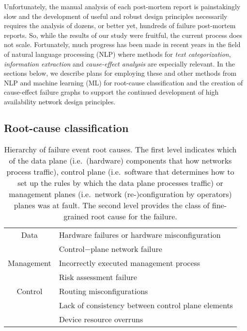 
Unfortunately, the manual analysis of each post-mortem report is
painstakingly slow and the development of useful and robust design
principles necessarily requires the analysis of dozens, or better yet,
hundreds of failure post-mortem reports.  So, while the results of our
study were fruitful, the current process does not scale.
%
Fortunately, much progress has been made in recent years in the field
of natural language processing (NLP) where methods for {\it text
  categorization}, {\it information extraction} and {\it cause-effect
  analysis} are especially relevant.  In the sections below, we
 describe plans for employing these and other methods from NLP and
machine learning (ML) for root-cause classification and the creation
of cause-effect failure graphs to support the continued development of
high availability network design principles.
    
\subsection{Root-cause classification}

\begin{table}[thbp]
  \centering
  \begin{tabular}{|c|l|} \hline
    Data & Hardware failures or hardware misconfiguration \\ \cline{2-2}
         & Control−plane network failure \\ \hline
    Management & Incorrectly executed management process \\ \cline{2-2}
               & Risk assessment failure \\ \hline
    Control & Routing misconfigurations \\ \cline{2-2}
            & Lack of consistency between control plane elements \\ \cline{2-2}
    & Device resource overruns \\ \hline
  \end{tabular}
  \caption{Hierarchy of failure event root causes.  The first level
    indicates which of the data plane (i.e.\ (hardware) components
    that how networks process traffic), control plane (i.e.\ software
    that determines how to set up the rules by which the data plane
    processes traffic) or management planes (i.e.\ network
    (re-)configuration by operators) planes was at fault. The second
    level provides the class of fine-grained root cause for the
    failure.}
   \label{table:root-causes}
\end{table}

